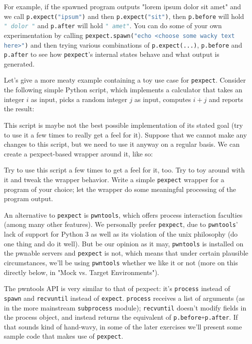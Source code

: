 \documentclass{article}
\newcommand{\xcode}[2]{\colorbox{ubuntuback}{\lstinline[language=#1]|#2|}}
\newcommand{\code}[1]{\colorbox{ubuntuback}{\texttt{#1}}}
\begin{document}
For example, if the spawned program outputs "lorem ipsum dolor sit amet" and we call \xcode{python}{p.expect("ipsum")} and then \xcode{python}{p.expect("sit")}, then \xcode{python}{p.before} will hold \xcode{python}{" dolor "} and \xcode{python}{p.after} will hold \xcode{python}{" amet"}. You can do some of your own experimentation by calling \xcode{python}{pexpect.spawn("echo <choose some wacky text here>")} and then trying various combinations of \xcode{python}{p.expect(...)}, \xcode{python}{p.before} and \xcode{python}{p.after} to see how \xcode{python}{pexpect}'s internal states behave and what output is generated.

Let's give a more meaty example containing a toy use case for \xcode{python}{pexpect}. Consider the following simple Python script, which implements a calculator that takes an integer $i$ as input, picks a random integer $j$ as input, computes $i+j$ and reports the result:



This script is maybe not the best possible implementation of its stated goal (try to use it a few times to really get a feel for it). Suppose that we cannot make any changes to this script, but we need to use it anyway on a regular basis. We can create a pexpect-based wrapper around it, like so:



Try to use this script a few times to get a feel for it, too. Try to toy around with it and tweak the wrapper behavior. Write a simple \code{pexpect} wrapper for a program of your choice; let the wrapper do some meaningful processing of the program output.

An alternative to \xcode{python}{pexpect} is \xcode{python}{pwntools}, which offers process interaction faculties (among many other features). We personally prefer \xcode{python}{pexpect}, due to \code{pwntools}' lack of support for Python 3 as well as its violation of the unix philosophy (do one thing and do it well). But be our opinion as it may, \code{pwntools} is installed on the pwnable servers and \code{pexpect} is not, which means that under certain plausible circumstances, we'll be using \code{pwntools} whether we like it or not (more on this directly below, in "Mock vs. Target Environments"). 

The pwntools API is very similar to that of pexpect: it's \xcode{python}{process} instead of \xcode{python}{spawn} and \xcode{python}{recvuntil} instead of \xcode{python}{expect}. \xcode{python}{process} receives a list of arguments (as in the more mainstream \xcode{python}{subprocess} module); \xcode{python}{recvuntil} doesn't modify fields in the process object, and instead returns the equivalent of \xcode{python}{p.before+p.after}. If that sounds kind of hand-wavy, in some of the later exercises we'll present some sample code that makes use of \code{pexpect}.
\end{document}
